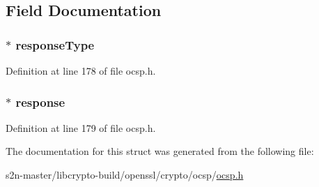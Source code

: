 \subsection{Field Documentation}
\subsubsection[{\texorpdfstring{response\+Type}{responseType}}]{ $\ast$ response\+Type}\hypertarget{structocsp__resp__bytes__st_ac770e491617844444e32c19cce7d230f}{}\label{structocsp__resp__bytes__st_ac770e491617844444e32c19cce7d230f}


Definition at line 178 of file ocsp.\+h.

\subsubsection[{\texorpdfstring{response}{response}}]{ $\ast$ response}\hypertarget{structocsp__resp__bytes__st_a3ed5d29c142420cadf1386ab349d07fe}{}\label{structocsp__resp__bytes__st_a3ed5d29c142420cadf1386ab349d07fe}


Definition at line 179 of file ocsp.\+h.



The documentation for this struct was generated from the following file\+:\begin{DoxyCompactItemize}
\item 
s2n-\/master/libcrypto-\/build/openssl/crypto/ocsp/\hyperlink{crypto_2ocsp_2ocsp_8h}{ocsp.\+h}\end{DoxyCompactItemize}

